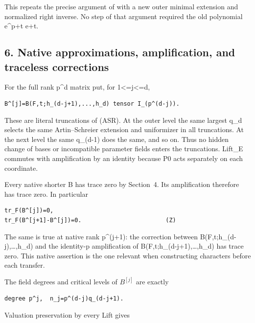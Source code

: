 This repeats the precise argument of  with a new
outer minimal extension and normalized right inverse. No step of that
argument required the old polynomial e\^{}p+t e+t.

\hypertarget{odd_tower-native-approximations-amplification-and-traceless-corrections}{%
\subsection{6. Native approximations, amplification, and traceless
corrections}\label{odd_tower-native-approximations-amplification-and-traceless-corrections}}

For the full rank p\^{}d matrix put, for 1\textless=j\textless=d,

\begin{Verbatim}[fontsize=\small,breaklines=true,breakanywhere=true]
B^[j]=B(F,t;h_(d-j+1),...,h_d) tensor I_(p^(d-j)).
\end{Verbatim}

These are literal truncations of (ASR). At the outer level the same
largest q\_d selects the same Artin--Schreier extension and uniformizer
in all truncations. At the next level the same q\_(d-1) does the same,
and so on. Thus no hidden change of bases or incompatible parameter
fields enters the truncations. Lift\_E commutes with amplification by an
identity because P0 acts separately on each coordinate.

Every native shorter B has trace zero by Section~4. Its amplification
therefore has trace zero. In particular

\begin{Verbatim}[fontsize=\small,breaklines=true,breakanywhere=true]
tr_F(B^[j])=0,
tr_F(B^[j+1]-B^[j])=0.                        (Z)
\end{Verbatim}

The same is true at native rank p\^{}(j+1): the correction between
B(F,t;h\_(d-j),\ldots,h\_d) and the identity-p amplification of
B(F,t;h\_(d-j+1),\ldots,h\_d) has trace zero. This native assertion is
the one relevant when constructing characters before each transfer.

The field degrees and critical levels of \(B^{[j]}\) are exactly

\begin{Verbatim}[fontsize=\small,breaklines=true,breakanywhere=true]
degree p^j,  n_j=p^(d-j)q_(d-j+1).
\end{Verbatim}

Valuation preservation by every Lift gives

